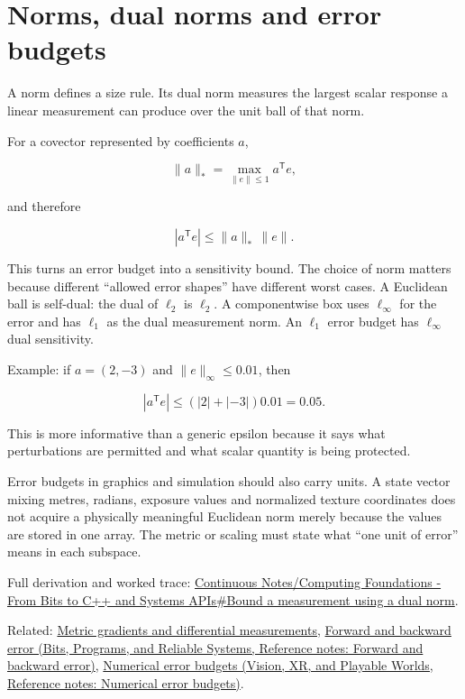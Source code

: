 \hypertarget{appendix-d6d9dbbe3c14}{}\label{referencestart:appendix-d6d9dbbe3c14}
\section{Norms, dual norms and error budgets}\label{appendix-d6d9dbbe3c14-norms-dual-norms-and-error-budgets}

\hypertarget{appendix-d6d9dbbe3c14-norms-dual-norms-and-error-budgets}{}

A norm defines a size rule. Its dual norm measures the largest scalar response a linear measurement can produce over the unit ball of that norm.

For a covector represented by coefficients \(a\),

\[
\|a\|_* = \max_{\|e\|\le 1} a^{\mathsf T}e,
\]

and therefore

\[
|a^{\mathsf T}e|\le \|a\|_*\,\|e\|.
\]

This turns an error budget into a sensitivity bound. The choice of norm matters because different ``allowed error shapes'' have different worst cases. A Euclidean ball is self-dual: the dual of \(\ell_2\) is \(\ell_2\). A componentwise box uses \(\ell_\infty\) for the error and has \(\ell_1\) as the dual measurement norm. An \(\ell_1\) error budget has \(\ell_\infty\) dual sensitivity.

Example: if \(a=(2,-3)\) and \(\|e\|_\infty\le0.01\), then

\[
|a^{\mathsf T}e|
\le (|2|+|{-3}|)0.01
=0.05.
\]

This is more informative than a generic epsilon because it says what perturbations are permitted and what scalar quantity is being protected.

Error budgets in graphics and simulation should also carry units. A state vector mixing metres, radians, exposure values and normalized texture coordinates does not acquire a physically meaningful Euclidean norm merely because the values are stored in one array. The metric or scaling must state what ``one unit of error'' means in each subspace.

Full derivation and worked trace: \hyperref[01-foundations-i-ch017-bound-a-measurement-using-a-dual-norm]{Continuous Notes/Computing Foundations - From Bits to C++ and Systems APIs\#Bound a measurement using a dual norm}.

Related: \hyperref[appendix-f4acdb1d5563]{Metric gradients and differential measurements}, \href{../01-Bits-Programs-and-Reliable-Systems/main.pdf\#nameddest=appendix-a7fbaf6d1b1c}{Forward and backward error (Bits, Programs, and Reliable Systems, Reference notes: Forward and backward error)}, \href{../07-Vision-XR-and-Playable-Worlds/main.pdf\#nameddest=appendix-31b8c295e05f}{Numerical error budgets (Vision, XR, and Playable Worlds, Reference notes: Numerical error budgets)}.
